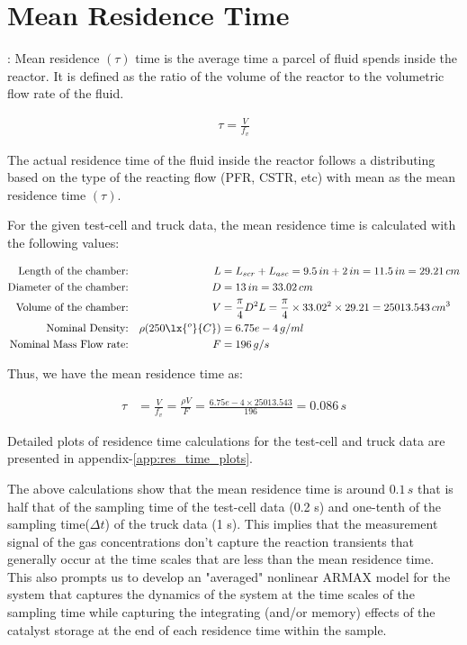 \newpage
\section{Mean Residence Time}

: Mean residence $(\tau)$ time is the average time a parcel of
fluid spends inside the reactor. It is defined as the ratio of the volume of
the reactor to the volumetric flow rate of the fluid.

\begin{align}
    \tau = \frac{V}{f_v}
\end{align}

The actual residence time of the fluid inside the reactor follows a distributing
based on the type of the reacting flow (PFR, CSTR, etc) with mean as the mean
residence time $(\tau)$.

For the given test-cell and truck data, the mean residence time is calculated
with the following values:

\begin{align*}
    \text{Length of the chamber:}&&
    L &= L_{scr} + L_{asc} = 9.5 \, in  + 2 \, in = 11.5 \, in = 29.21 \, cm\\
    \text{Diameter of the chamber:} &&
    D &= 13 \, in = 33.02 \, cm\\
    \text{Volume of the chamber:} &&
    V &= \frac{\pi}{4} D^2 L = \frac{\pi}{4} \times 33.02^2 \times 29.21 = 25013.543 \, cm^3\\
    \text{Nominal Density:} &&
    \rho(250 \lx{^o}{C}) &= 6.75e-4 \, g/ml\\
    \text{Nominal Mass Flow rate:} &&
    F &= 196 \, g/s\\
\end{align*}

Thus, we have the mean residence time as:

\begin{align}
    \tau &= \frac{V}{f_v} = \frac{\rho V}{F} = \frac{6.75e-4 \times 25013.543}{196} = 0.086 \, s
\end{align}

Detailed plots of residence time calculations for the test-cell and truck data
are presented in appendix-\ref{app:res_time_plots}.

The above calculations show that the mean residence time is around $0.1 \, s$
that is half that of the sampling time of the test-cell data (0.2 s) and
one-tenth of the sampling time($\Delta t$) of the truck data (1 s). This
implies that the measurement signal of the gas concentrations don't capture the
reaction transients that generally occur at the time scales  that are less than
the mean residence time. This also prompts us to develop an "averaged"
nonlinear ARMAX model for the system that captures the dynamics of the system
at the time scales of the sampling time while capturing the integrating (and/or
memory) effects of the catalyst storage at the end of each residence time
within the sample.

